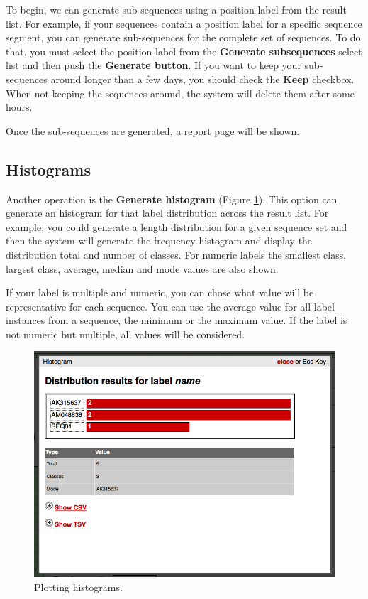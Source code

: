 To begin, we can generate sub-sequences using a position label from the result list. For example,
if your sequences contain a position label for a specific sequence segment, you can generate
sub-sequences for the complete set of sequences. To do that, you must select the position label
from the \textbf{Generate subsequences} select list and then push the \textbf{Generate button}.
If you want to keep your sub-sequences around longer than a few days, you should check the \textbf{Keep}
checkbox. When not keeping the sequences around, the system will delete them after some hours.

Once the sub-sequences are generated, a report page will be shown.

\subsection{Histograms}

Another operation is the \textbf{Generate histogram} (Figure \ref{fig:histogram_man}).
This option can generate an histogram
for that label distribution across the result list. For example, you could generate a length
distribution for a given sequence set and then the system will generate the frequency histogram
and display the distribution total and number of classes.
For numeric labels the smallest class, largest class, average, median and mode values are also shown.

If your label is multiple and numeric, you can chose what value will be representative for each sequence.
You can use the average value for all label instances from a sequence, the minimum or the maximum value.
If the label is not numeric but multiple, all values will be considered.

\begin{figure}[ht]
  \centering
    \includegraphics[scale=0.4]{histogram.png}
  \caption{Plotting histograms.}
  \label{fig:histogram_man}
\end{figure}

